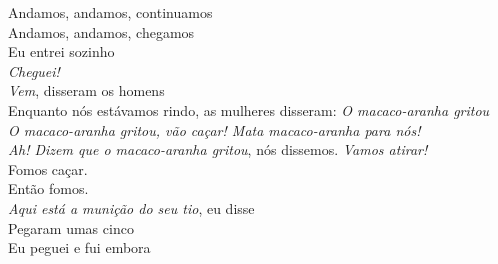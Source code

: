 \begin{linenumbers}\begingroup\raggedright
 
\noindent   Andamos, andamos, continuamos\\
  Andamos, andamos, chegamos\\
  Eu entrei sozinho\\
  \emph{Cheguei!}\\
  \emph{Vem}, disseram os homens\\
  Enquanto nós estávamos rindo, as mulheres disseram: \emph{O macaco-aranha gritou}\\
  \emph{O macaco-aranha gritou, vão caçar! Mata macaco-aranha para nós!}\\
  \emph{Ah! Dizem que o macaco-aranha gritou}, nós dissemos. \emph{Vamos atirar!}\\
  Fomos caçar.\\
  Então fomos.\\
  \emph{Aqui está a munição do seu tio}, eu disse\\
  Pegaram umas cinco\\
  Eu peguei e fui embora

\end{linenumbers}\endgroup

\bigskip

